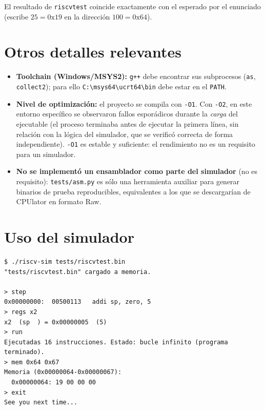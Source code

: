 \documentclass[11pt,a4paper]{article}
\newcommand{\code}[1]{\texttt{#1}}
\begin{document}
El resultado de \code{riscvtest} coincide exactamente con el esperado por el
enunciado (escribe $25 = \text{0x19}$ en la dirección $100 = \text{0x64}$).

\section{Otros detalles relevantes}

\begin{itemize}[topsep=2pt]
  \item \textbf{Toolchain (Windows/MSYS2):} \code{g++} debe encontrar sus
        subprocesos (\code{as}, \code{collect2}); para ello
        \code{C:\textbackslash msys64\textbackslash ucrt64\textbackslash bin}
        debe estar en el \code{PATH}.
  \item \textbf{Nivel de optimización:} el proyecto se compila con \code{-O1}.
        Con \code{-O2}, en este entorno específico se observaron fallos
        esporádicos durante la \emph{carga} del ejecutable (el proceso terminaba
        antes de ejecutar la primera línea, sin relación con la lógica del
        simulador, que se verificó correcta de forma independiente). \code{-O1}
        es estable y suficiente: el rendimiento no es un requisito para un
        simulador.
  \item \textbf{No se implementó un ensamblador como parte del simulador} (no es
        requisito): \code{tests/asm.py} es sólo una herramienta auxiliar para
        generar binarios de prueba reproducibles, equivalentes a los que se
        descargarían de CPUlator en formato Raw.
\end{itemize}

\section{Uso del simulador}

\begin{lstlisting}
$ ./riscv-sim tests/riscvtest.bin
"tests/riscvtest.bin" cargado a memoria.

> step
0x00000000:  00500113   addi sp, zero, 5
> regs x2
x2  (sp  ) = 0x00000005  (5)
> run
Ejecutadas 16 instrucciones. Estado: bucle infinito (programa terminado).
> mem 0x64 0x67
Memoria (0x00000064-0x00000067):
  0x00000064: 19 00 00 00
> exit
See you next time...
\end{lstlisting}
\end{document}
